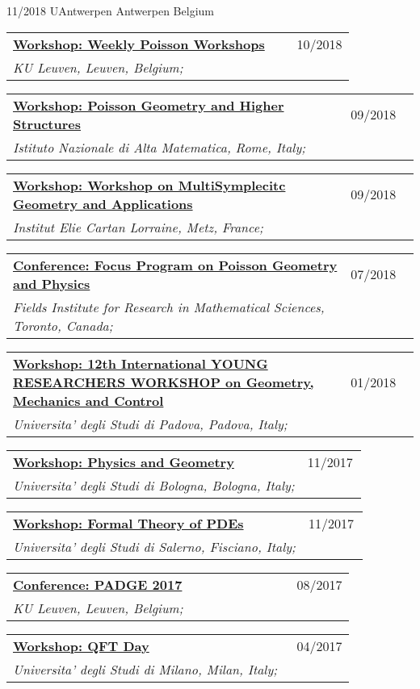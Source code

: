 \documentclass[a4paper]{article}
\newcommand{\longvoice}[8]{
    \begin{tabular}{p{0.83\linewidth} p{0.17\linewidth} }
        \textbf{\href{#3}{#2: #1}} & #4 
        \\ 
        \textit{#5, #6, #7;} & {\small\emph{#8}}
    \end{tabular}
    \vspace{.5em}
}
\begin{document}
        {11/2018}
        {UAntwerpen}
        {Antwerpen}
        {Belgium}
        {}
    \longvoice{Weekly Poisson Workshops}
        {Workshop}
        {https://wis.kuleuven.be/meetkunde/PoissonWorkingGroup}
        {10/2018}
        {KU Leuven}
        {Leuven}
        {Belgium}
        {}
    \longvoice{Poisson Geometry and Higher Structures}
        {Workshop}
        {https://web.archive.org/web/20190831103317/http://www1.mat.uniroma1.it/ricerca/convegni/2018/hippo2018/index.html}
        {09/2018}
        {Istituto Nazionale di Alta Matematica}
        {Rome}
        {Italy}
        {}
    \longvoice{Workshop on MultiSymplecitc Geometry and Applications}
        {Workshop}
        {https://web.archive.org/web/20180704152639/http://www.math.univ-metz.fr/~wurzbacher/GEMSA.html}
        {09/2018}
        {Institut Elie Cartan Lorraine}
        {Metz}
        {France}
        {}
    \longvoice{Focus Program on Poisson Geometry and Physics}
        {Conference}
        {https://web.archive.org/web/20190831105328/http://www.fields.utoronto.ca/activities/18-19/poisson-2018}
        {07/2018}
        {Fields Institute for Research in Mathematical Sciences}
        {Toronto}
        {Canada}
        {}
    \longvoice{12th International YOUNG RESEARCHERS WORKSHOP on Geometry, Mechanics and Control}
        {Workshop}
        {http://events.math.unipd.it/12YRW/}
        {01/2018}
        {Universita' degli Studi di Padova}
        {Padova}
        {Italy}
        {}
    \longvoice{Physics and Geometry}
        {Workshop}
        {https://agenda.infn.it/conferenceDisplay.py?confId=14261}
        {11/2017}
        {Universita' degli Studi di Bologna}
        {Bologna}
        {Italy}
        {}
    \longvoice{Formal Theory of PDEs}
        {Workshop}
        {http://www.dipmat2.unisa.it/people/vitagliano/www/micro-workshop.html}
        {11/2017}
        {Universita' degli Studi di Salerno}
        {Fisciano}
        {Italy}
        {}
    \longvoice{PADGE 2017}
        {Conference}
        {https://web.archive.org/web/20170924130155/https://wis.kuleuven.be/events/padge2017}
        {08/2017}
        {KU Leuven}
        {Leuven}
        {Belgium}
        {}
    \longvoice{QFT Day}
        {Workshop}
        {https://web.archive.org/web/20170924130005/http://www.matematica.unimi.it/extfiles/unimidire/66001/attachment/qft-day-2017-1.pdf}
        {04/2017}
        {Universita' degli Studi di Milano}
        {Milan}
        {Italy}
        {}



\end{document}
